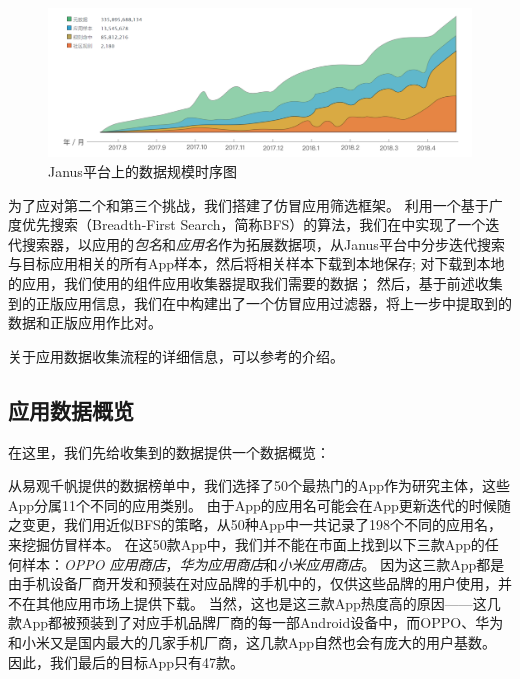 \begin{figure}[htbp]
	\centering
	\includegraphics[width=\textwidth]{./Figures/edwin-Janus-data.png}
	\caption{Janus平台上的数据规模时序图}
	\label{fig:Janus-data}
	\vspace{-5mm}
\end{figure}

为了应对第二个和第三个挑战，我们搭建了仿冒应用筛选框架\mytool。
利用一个基于广度优先搜索（Breadth-First Search，简称BFS）的算法，我们在\mytool 中实现了一个迭代搜索器，以应用的\emph{包名}和\emph{应用名}作为拓展数据项，从Janus平台中分步迭代搜索与目标应用相关的所有App样本，然后将相关样本下载到本地保存;
对下载到本地的应用，我们使用\mytool 的组件应用收集器提取我们需要的数据；
然后，基于前述收集到的正版应用信息，我们在\mytool 中构建出了一个仿冒应用过滤器，将上一步中提取到的数据和正版应用作比对。

关于应用数据收集流程的详细信息，可以参考的介绍。

\subsection{应用数据概览}
在这里，我们先给收集到的数据提供一个数据概览：

从易观千帆提供的数据榜单中，我们选择了50个最热门的App作为研究主体，这些App分属11个不同的应用类别。
由于App的应用名可能会在App更新迭代的时候随之变更，我们用近似BFS的策略，从50种App中一共记录了198个不同的应用名，来挖掘仿冒样本。
在这50款App中，我们并不能在市面上找到以下三款App的任何样本：\emph{OPPO 应用商店}，\emph{华为应用商店}和\emph{小米应用商店}。
因为这三款App都是由手机设备厂商开发和预装在对应品牌的手机中的，仅供这些品牌的用户使用，并不在其他应用市场上提供下载。
当然，这也是这三款App热度高的原因——这几款App都被预装到了对应手机品牌厂商的每一部Android设备中，而OPPO、华为和小米又是国内最大的几家手机厂商，这几款App自然也会有庞大的用户基数。
因此，我们最后的目标App只有47款。

